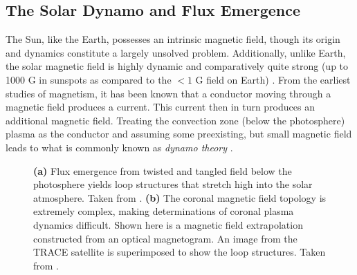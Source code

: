 \subsection{The Solar Dynamo and Flux Emergence}
\label{subsec:dynamo_flux}
\par The Sun, like the Earth, possesses an intrinsic magnetic field, though its origin and dynamics constitute a largely unsolved problem. Additionally, unlike Earth, the solar magnetic field is highly dynamic and comparatively quite strong (up to 1000 G in sunspots as compared to the $<1$ G field on Earth) \citep{aschwanden_physics_2006}. From the earliest studies of magnetism, it has been known that a conductor moving through a magnetic field produces a current. This current then in turn produces an additional magnetic field. Treating the convection zone (below the photosphere) plasma as the conductor and assuming some preexisting, but small magnetic field leads to what is commonly known as \textit{dynamo theory} \citep{golub_solar_2010}.
%
\begin{figure}[htbp]
	\centering
	\caption{\textbf{(a)} Flux emergence from twisted and tangled field below the photosphere yields loop structures that stretch high into the solar atmosphere. Taken from \citet{gold_magnetic_1964}. \textbf{(b)} The coronal magnetic field topology is extremely complex, making determinations of coronal plasma dynamics difficult. Shown here is a magnetic field extrapolation constructed from an optical magnetogram. An image from the TRACE satellite is superimposed to show the loop structures. Taken from \citet{reale_coronal_2010}.}
	\label{fig:complex_fields}
\end{figure}

